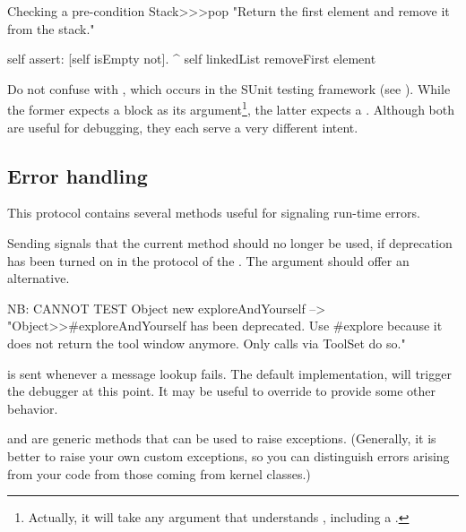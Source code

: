 \documentclass[a4paper,10pt,twoside]{book}
\begin{document}
\begin{method}{Checking a pre-condition}
Stack>>>pop
    "Return the first element and remove it from the stack."

    self assert: [self isEmpty not].
    ^ self linkedList removeFirst element
\end{method}

Do not confuse  with , which occurs in the SUnit testing framework (see ).
While the former expects a block as its argument\footnote{Actually, it will take any argument that understands , including a .}, the latter expects a .
Although both are useful for debugging, they each serve a very different intent.

\subsection{Error handling}

This protocol contains several methods useful for signaling run-time errors.

Sending  signals that the current method should no longer be used, if deprecation has been turned on in the  protocol of the .
The  argument should offer an alternative.

\begin{code}{NB: CANNOT TEST}
Object new exploreAndYourself --> "Object>>#exploreAndYourself has been deprecated. Use #explore because it does not return the tool window anymore. Only calls via ToolSet do so."
\end{code}

 is sent whenever a message lookup fails.
The default implementation, \ie {} will trigger the debugger at this point.
It may be useful to override  to provide some other behavior.


 and  are generic methods that can be used to raise exceptions.
(Generally, it is better to raise your own custom exceptions, so you can distinguish errors arising from your code from those coming from kernel classes.)
\end{document}
